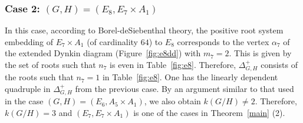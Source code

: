 \documentclass{amsart}
\theoremstyle{definition}
\theoremstyle{remark}
\numberwithin{equation}{section}
\begin{document}
\subsubsection{Case 2: $(G,H)=(E_{8},E_{7}\times A_{1})$}
\label{sect:9.3.2}
In this case, according to Borel-deSiebenthal theory,
the positive root system embedding of $E_{7}\times A_{1}$ (of cardinality $64$) to $E_{8}$ corresponds to the vertex $\alpha_{7}$ of the extended Dynkin diagram (Figure~\ref{fig:e8dd}) with $m_{7}=2$.
This is given by the set of roots such that $n_{7}$ is even in Table~\ref{fig:e8}. 
Therefore, $\Delta_{G,H}^{+}$ consists of the roots such that $n_{7}=1$  in Table~\ref{fig:e8}.
One has the linearly dependent quadruple in $\Delta^{+}_{G,H}$ from the previous case.
By an argument similar to that used in the case $(G,H)=(E_{6},A_{5}\times A_{1})$, we also obtain $k(G/H)\not=2$.
Therefore, $k(G/H)=3$ and $(E_{7},E_{7}\times A_{1})$ is one of the cases in Theorem~\ref{main} (2).

\end{document}
